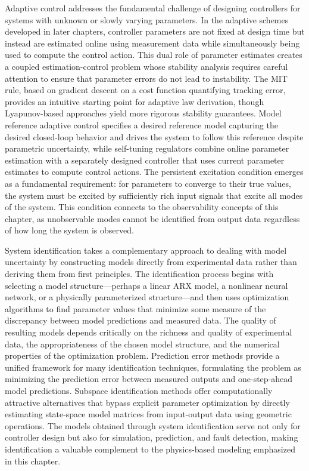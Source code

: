 Adaptive control addresses the fundamental challenge of designing controllers for systems with unknown or slowly varying parameters. In the adaptive schemes developed in later chapters, controller parameters are not fixed at design time but instead are estimated online using measurement data while simultaneously being used to compute the control action. This dual role of parameter estimates creates a coupled estimation-control problem whose stability analysis requires careful attention to ensure that parameter errors do not lead to instability. The MIT rule, based on gradient descent on a cost function quantifying tracking error, provides an intuitive starting point for adaptive law derivation, though Lyapunov-based approaches yield more rigorous stability guarantees. Model reference adaptive control specifies a desired reference model capturing the desired closed-loop behavior and drives the system to follow this reference despite parametric uncertainty, while self-tuning regulators combine online parameter estimation with a separately designed controller that uses current parameter estimates to compute control actions. The persistent excitation condition emerges as a fundamental requirement: for parameters to converge to their true values, the system must be excited by sufficiently rich input signals that excite all modes of the system. This condition connects to the observability concepts of this chapter, as unobservable modes cannot be identified from output data regardless of how long the system is observed.

System identification takes a complementary approach to dealing with model uncertainty by constructing models directly from experimental data rather than deriving them from first principles. The identification process begins with selecting a model structure—perhaps a linear ARX model, a nonlinear neural network, or a physically parameterized structure—and then uses optimization algorithms to find parameter values that minimize some measure of the discrepancy between model predictions and measured data. The quality of resulting models depends critically on the richness and quality of experimental data, the appropriateness of the chosen model structure, and the numerical properties of the optimization problem. Prediction error methods provide a unified framework for many identification techniques, formulating the problem as minimizing the prediction error between measured outputs and one-step-ahead model predictions. Subspace identification methods offer computationally attractive alternatives that bypass explicit parameter optimization by directly estimating state-space model matrices from input-output data using geometric operations. The models obtained through system identification serve not only for controller design but also for simulation, prediction, and fault detection, making identification a valuable complement to the physics-based modeling emphasized in this chapter.

